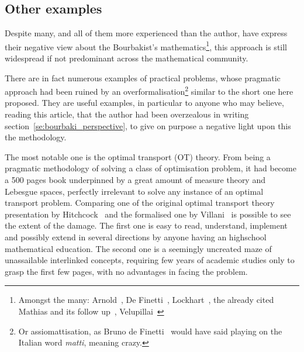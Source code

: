 \documentclass[]{scrartcl}
\theoremstyle{definition}
\begin{document}
\subsection*{Other examples}

Despite many, and all of them more experienced than the author, have express their negative view about the Bourbakist's mathematics\footnote{
    Amongst the many: Arnold~\cite{arnol1998teaching}, De Finetti~\cite{de2008bruno}, Lockhart~\cite{lockhart2009mathematician}, the already cited Mathias and its follow up~\cite{mathias1998further}, Velupillai~\cite{velupillai2012bourbaki}
}, this approach is still widespread if not predominant across the mathematical community. 

There are in fact numerous examples of practical problems, whose pragmatic approach had been ruined by an overformalisation\footnote{
    Or assiomattisation, as Bruno de Finetti~\cite{de2008bruno} would have said playing on the Italian word \emph{matti}, meaning crazy.
} similar to the short one here proposed. They are useful examples, in particular to anyone who may believe, reading this article, that the author had been overzealous in writing section~\ref{se:bourbaki_perspective}, to give on purpose a negative light upon this the methodology.

The most notable one is the optimal transport (OT) theory. From being a pragmatic methodology of solving a class of optimisation problem, it had become a 500 pages book underpinned by a great amount of measure theory and Lebesgue spaces, perfectly irrelevant to solve any instance of an optimal transport problem. Comparing one of the original optimal transport theory presentation by Hitchcock~\cite{hitchcock1941distribution} and the formalised one by Villani~\cite{villani2003topics} is possible to see the extent of the damage. The first one is easy to read, understand, implement and possibly extend in several directions by anyone having an highschool mathematical education. The second one is a seemingly uncreated maze of unassailable interlinked concepts, requiring few years of academic studies only to grasp the first few pages, with no advantages in facing the problem. %
\end{document}
